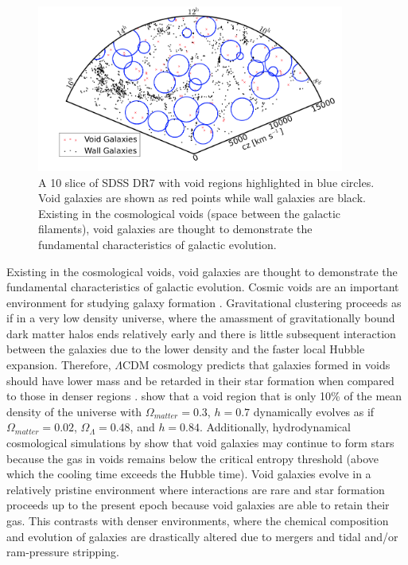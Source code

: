 \begin{figure}
    \includegraphics[width=0.9\textwidth]{Images/Intro/VoidFinder}
    \caption[Sky map highlighting voids and void galaxies]{A 10 \hMpc slice of 
    SDSS DR7 \citep[Fig. 1]{Moorman14} with void regions highlighted in blue 
    circles.  Void galaxies are shown as red points while wall galaxies are 
    black.  Existing in the cosmological voids (space between the galactic 
    filaments), void galaxies are thought to demonstrate the fundamental 
    characteristics of galactic evolution.}
\end{figure}

Existing in the cosmological voids, void galaxies are thought to demonstrate the 
fundamental characteristics of galactic evolution.  Cosmic voids are an 
important environment for studying galaxy formation \citep[see][for a review]
{vandeWeygaert11}.  Gravitational clustering proceeds as if in a very low 
density universe, where the amassment of gravitationally bound dark matter halos 
ends relatively early and there is little subsequent interaction between the 
galaxies due to the lower density and the faster local Hubble expansion.  
Therefore, $\Lambda$CDM cosmology predicts that galaxies formed in voids should 
have lower mass and be retarded in their star formation when compared to those 
in denser regions \cite[e.g.,][]{Gottlober03,Goldberg05,Cen11}.  
\cite{Goldberg04} show that a void region that is only 10\% of the mean density 
of the universe with $\Omega_{matter} = 0.3$, $h = 0.7$ dynamically evolves as 
if $\Omega_{matter} = 0.02$, $\Omega_\Lambda = 0.48$, and $h = 0.84$.  
Additionally, hydrodynamical cosmological simulations by \cite{Cen11} show that 
void galaxies may continue to form stars because the gas in voids remains below 
the critical entropy threshold (above which the cooling time exceeds the Hubble 
time).  Void galaxies evolve in a relatively pristine environment where 
interactions are rare and star formation proceeds up to the present epoch 
because void galaxies are able to retain their gas.  This contrasts with denser 
environments, where the chemical composition and evolution of galaxies are 
drastically altered due to mergers and tidal and/or ram-pressure stripping.

